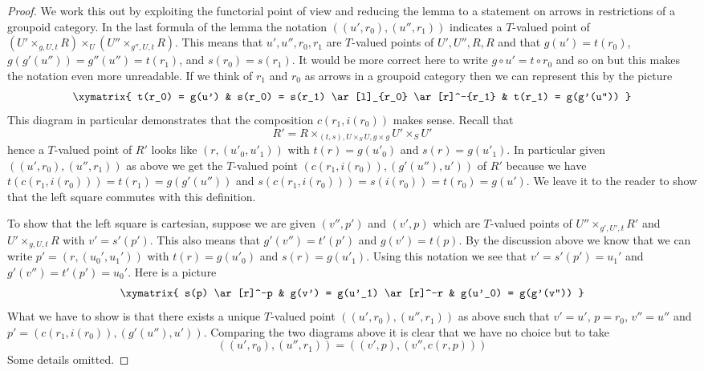 \begin{proof}
We work this out by exploiting the functorial point of view
and reducing the lemma to a statement on arrows in restrictions
of a groupoid category. In the last formula of the lemma the
notation $((u', r_0), (u'', r_1))$ indicates a $T$-valued point of
$(U' \times_{g, U, t} R) \times_U (U'' \times_{g'', U, t} R)$.
This means that $u', u'', r_0, r_1$ are $T$-valued points of $U', U'', R, R$
and that $g(u') = t(r_0)$, $g(g'(u'')) = g''(u'') = t(r_1)$, and
$s(r_0) = s(r_1)$. It would be more correct here to write
$g \circ u' = t \circ r_0$ and so on but this makes the notation
even more unreadable. If we think of $r_1$ and $r_0$ as arrows in
a groupoid category then we can represent this by the picture
$$
\xymatrix{
t(r_0) = g(u') &
s(r_0) = s(r_1) \ar[l]_{r_0} \ar[r]^-{r_1} &
t(r_1) = g(g'(u''))
}
$$
This diagram in particular demonstrates that the composition
$c(r_1, i(r_0))$ makes sense. Recall that
$$
R' = R \times_{(t, s), U \times_S U, g \times g} U' \times_S U'
$$
hence a $T$-valued point of $R'$ looks like $(r, (u'_0, u'_1))$
with $t(r) = g(u'_0)$ and $s(r) = g(u'_1)$. In particular given
$((u', r_0), (u'', r_1))$ as above we get the $T$-valued point
$(c(r_1, i(r_0)), (g'(u''), u'))$ of $R'$ because we have
$t(c(r_1, i(r_0))) = t(r_1) = g(g'(u''))$ and
$s(c(r_1, i(r_0))) = s(i(r_0)) = t(r_0) = g(u')$.
We leave it to the reader to show that the left square commutes
with this definition.

\medskip\noindent
To show that the left square is cartesian,
suppose we are given $(v'', p')$ and $(v', p)$ which are $T$-valued points of
$U'' \times_{g', U', t} R'$ and $U' \times_{g, U, t} R$ with
$v' = s'(p')$. This also means that $g'(v'') = t'(p')$ and
$g(v') = t(p)$. By the discussion above we know that we can write
$p' = (r, (u_0', u_1'))$ with $t(r) = g(u'_0)$ and
$s(r) = g(u'_1)$. Using this notation we see that
$v' = s'(p') = u_1'$ and
$g'(v'') = t'(p') = u_0'$. Here is a picture
$$
\xymatrix{
s(p) \ar[r]^-p &
g(v') = g(u'_1) \ar[r]^-r &
g(u'_0) = g(g'(v''))
}
$$
What we have to show is that there exists a unique $T$-valued point
$((u', r_0), (u'', r_1))$ as above such that
$v' = u'$, $p = r_0$, $v'' = u''$ and $p' = (c(r_1, i(r_0)), (g'(u''), u'))$.
Comparing the two diagrams above it is clear that we have no choice
but to take
$$
((u', r_0), (u'', r_1)) = ((v', p), (v'', c(r, p)))
$$
Some details omitted.
\end{proof}

